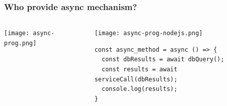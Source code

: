 \begin{frame}[fragile]	
    \frametitle{Who provide async mechanism?}
    \begin{columns}
    \begin{column}{.3\textwidth}
        \centering

            \texttt{[image: async-prog.png]}


    \end{column}
    
    \begin{column}{.7\textwidth}
        \centering
        \texttt{[image: async-prog-nodejs.png]}
        
            \begin{block}{}
            \begin{verbatim}
const async_method = async () => {
  const dbResults = await dbQuery();
  const results = await serviceCall(dbResults);
  console.log(results);
}
\end{verbatim}
        \end{block}
        
    \end{column}
\end{columns}
\end{frame}


